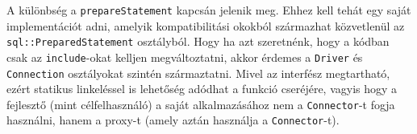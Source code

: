 A különbség a \texttt{prepareStatement} kapcsán jelenik meg. Ehhez kell tehát egy saját implementációt adni, amelyik kompatibilitási okokból származhat közvetlenül az \texttt{sql::PreparedStatement} osztályból. Hogy ha azt szeretnénk, hogy a kódban csak az \texttt{include}-okat kelljen megváltoztatni, akkor érdemes a \texttt{Driver} és \texttt{Connection} osztályokat szintén származtatni. Mivel az interfész megtartható, ezért statikus linkeléssel is lehetőség adódhat a funkció cseréjére, vagyis hogy a fejlesztő (mint célfelhasználó) a saját alkalmazásához nem a \texttt{Connector}-t fogja használni, hanem a proxy-t (amely aztán használja a \texttt{Connector}-t).


